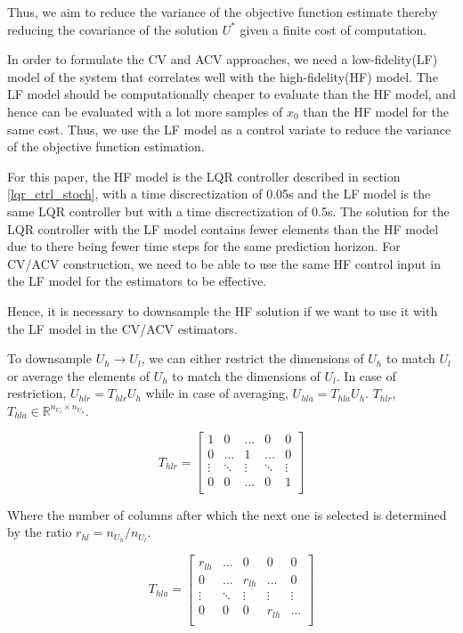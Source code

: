 \documentclass{article}
\begin{document}
Thus, we aim to reduce the variance of the objective function estimate thereby reducing the covariance of the
solution $U^*$ given a finite cost of computation.

In order to formulate the CV and ACV approaches, we need a low-fidelity(LF) model of the system that correlates well
with the high-fidelity(HF) model. The LF model should be computationally cheaper to evaluate than the
HF model, and hence can be evaluated with a lot more samples of $x_0$ than the HF model for the same cost.
Thus, we use the LF model as a control variate to reduce the variance of the objective function
estimation.

For this paper, the HF model is the LQR controller described in section \ref{lqr_ctrl_stoch}, with a time
discrectization of 0.05s and the LF model is the same LQR controller but with a time discrectization of 0.5s.
The solution for the LQR controller with the LF model contains fewer elements than the HF model due to there being
fewer time steps for the same prediction horizon. For CV/ACV construction, we need to be able to use the same
HF control input in the LF model for the estimators to be effective.

Hence, it is necessary to downsample the HF solution if we want to use it with the LF model in the CV/ACV estimators.

To downsample $U_h \rightarrow U_l$, we can either restrict the dimensions of $U_h$ to match $U_l$ or average the elements of $U_h$ to match the dimensions of $U_l$.
In case of restriction, $U_{hlr} = T_{hlr} U_h$ while in case of averaging, $U_{hla} = T_{hla} U_h$.
$T_{hlr}$, $T_{hla} \in \mathbb{R}^{n_{U_l} \times n_{U_h}}$.

$$
T_{hlr} =
\begin{bmatrix}
  1 & 0 & \ldots & 0 & 0 \\
  0 & \ldots & 1 & \ldots & 0 \\
  \vdots & \ddots & \vdots & \ddots & \vdots \\
  0 & 0 & \ldots & 0 & 1 \\
\end{bmatrix}
$$

Where the number of columns after which the next one is selected is determined by the ratio $r_{hl} = n_{U_h} / n_{U_l}$.

$$
T_{hla} =
\begin{bmatrix}
  r_{lh} & \ldots & 0 & 0 & 0 \\
  0 & \ldots & r_{lh} & \ldots & 0 \\
  \vdots & \ddots & \vdots & \vdots & \vdots \\
  0 & 0 & 0 & r_{lh} & \ldots \\
\end{bmatrix}
$$
\end{document}
